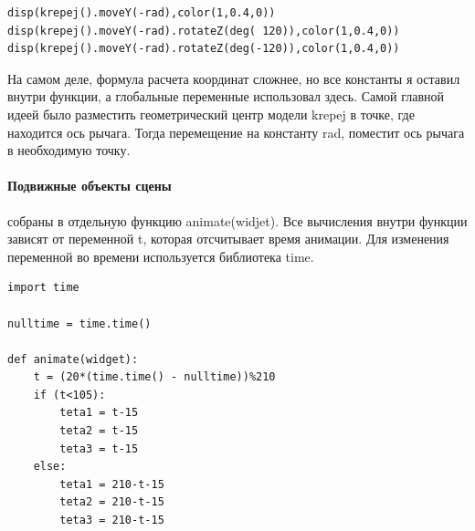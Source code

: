 \begin{lstlisting}[style=python,caption=Растановка объектов методом полярных координат]
disp(krepej().moveY(-rad),color(1,0.4,0))
disp(krepej().moveY(-rad).rotateZ(deg( 120)),color(1,0.4,0))
disp(krepej().moveY(-rad).rotateZ(deg(-120)),color(1,0.4,0))
\end{lstlisting}
 
 На самом деле, формула расчета координат сложнее, но все константы я оставил внутри функции, а глобальные переменные использовал здесь. Самой главной идеей было разместить геометрический центр модели krepej в точке, где находится ось рычага. Тогда перемещение на константу rad, поместит ось рычага в необходимую точку. 
 
 \paragraph{Подвижные объекты сцены} собраны в отдельную функцию animate(widjet). Все вычисления внутри функции зависят от переменной t, которая отсчитывает время анимации. Для изменения переменной во времени используется библиотека time. 
 
\begin{lstlisting}[style=python,caption=Работа со временной переменной]
import time

nulltime = time.time()

def animate(widget):
    t = (20*(time.time() - nulltime))%210
    if (t<105):
        teta1 = t-15
        teta2 = t-15
        teta3 = t-15
    else:
        teta1 = 210-t-15
        teta2 = 210-t-15
        teta3 = 210-t-15
\end{lstlisting}

